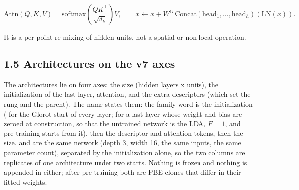 \documentclass[10pt,a4paper]{article}
\begin{document}
\[
\mathrm{Attn}(Q, K, V) = \mathrm{softmax}\!\left(\frac{QK^{\top}}{\sqrt{d_k}}\right) V, \qquad
x \leftarrow x + W^{O}\,\mathrm{Concat}(\mathrm{head}_1, \ldots, \mathrm{head}_h)(\mathrm{LN}(x)).
\]

It is a per-point re-mixing of hidden units, not a spatial or non-local operation.

\subsection*{1.5 Architectures on the v7 axes}

The architectures lie on four axes: the size (hidden layers x units), the initialization of the last layer, attention, and the extra descriptors (which set the rung and the parent). The name states them: the family word is the initialization ( for the Glorot start of every layer;  for a last layer whose weight and bias are zeroed at construction, so that the untrained network is the LDA, $F = 1$, and pre-training starts from it), then the descriptor and attention tokens, then the size.  and  are the same network (depth 3, width 16, the same inputs, the same parameter count), separated by the initialization alone, so the two columns are replicates of one architecture under two starts. Nothing is frozen and nothing is appended in either; after pre-training both are PBE clones that differ in their fitted weights.
\end{document}
